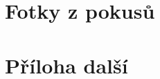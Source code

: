 \documentclass[12pt]{report}			%
\begin{document}
	\nocite{*}
    	\printbibliography					
    \printglossary[title={Zkratky}]		
    \listoffigures					
    \listoftables						

    \begin{appendices}
	\chapter{Fotky z pokusů}	
	\lipsum[1]
	\chapter{Příloha další }
	\end{appendices}
\end{document}
